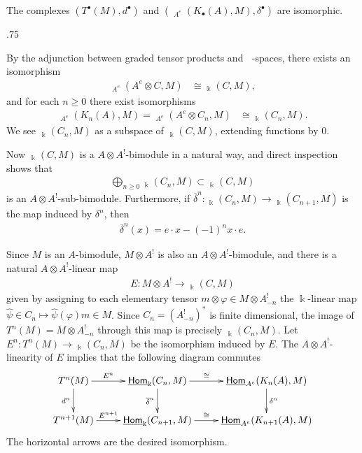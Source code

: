 \documentclass[11pt,fleqn]{article}
\makeatletter
\renewenvironment{proof}[1][\proofname]{\par
  \pushQED{\qed}%
  \normalfont \topsep.75\paraskip\relax
  \trivlist
  \item[\hskip\labelsep
        \itshape
    #1\@addpunct{.}]\ignorespaces
}{%
  \popQED\endtrivlist\@endpefalse
}
\newcommand\ot{\otimes}
\renewcommand\to{\longrightarrow}
\renewcommand\phi{\varphi}
\renewcommand\k{\Bbbk}
\DeclareMathOperator\HOM{\underline{\mathsf{Hom}}}
\makeatother
\begin{document}
\begin{Lemma*}
The complexes $(T^\bullet(M), d^\bullet)$ and $(\HOM_{A^e}(K_\bullet(A), M), 
\delta^\bullet)$ are isomorphic.
\end{Lemma*}
\begin{proof}
By the adjunction between graded tensor products and $\HOM$-spaces, there exists
an isomorphism
\begin{align*}
\HOM_{A^e}(A^e \ot C, M) &\cong \HOM_\k(C,M),
\end{align*}
and for each $n \geq 0$ there exist isomorphisms
\begin{align*}
\HOM_{A^e}(K_n(A), M) = \HOM_{A^e}(A^e \ot C_n, M) & \cong \HOM_\k(C_n, M).
\end{align*}
We see $\HOM_\k(C_n, M)$ as a subspace of $\HOM_\k(C, M)$, extending functions by $0$.

Now $\HOM_\k(C,M)$ is a $A \ot A^!$-bimodule in a natural way, and direct inspection 
shows that 
\begin{align*}
\bigoplus_{n \geq 0} \HOM_\k(C_n,M) \subset \HOM_\k(C,M)
\end{align*}
is an $A \ot A^!$-sub-bimodule. Furthermore, if $\overline \delta^n: \HOM_\k(C_n, M) \to 
\HOM_\k(C_{n+1}, M)$ is the map induced by $\delta^n$, then
\begin{align*}
	\overline\delta^n(x) = e \cdot x - (-1)^n x \cdot e.
\end{align*}

Since $M$ is an $A$-bimodule, $M \ot A^!$ is also an $A \ot A^!$-bimodule, and there is 
a natural $A \ot A^!$-linear map
\begin{align*}
	E: M \ot A^! \to \HOM_\k(C,M)
\end{align*}
given by assigning to each elementary tensor $m \ot \phi \in M \ot A^!_{-n}$ the 
$\k$-linear map $\hat \psi \in C_n \mapsto \hat\psi(\phi)m \in M$. Since $C_n = 
(A_{-n}^!)^*$ is finite dimensional, the image of $T^n(M) = M \ot A^!_{-n}$ through this 
map is precisely $\HOM_\k(C_n, M)$. Let $E^n: T^n(M) \to \HOM_\k(C_n, M)$ be the 
isomorphism induced by $E$. The $A \ot A^!$-linearity of $E$ implies that the following 
diagram commutes
\begin{align*}
\xymatrix{
	T^n(M) 
		\ar[d]_-{d^n} \ar[r]^-{E^n} 
	& \HOM_\k(C_n, M) 
		\ar[d]_-{\overline \delta^n} \ar[r]^-{\cong}
	& \HOM_{A^e}(K_n(A), M) 
		\ar[d]^-{\delta^n} \\
	T^{n+1}(M) 
		\ar[r]^-{E^{n+1}} 
	& \HOM_\k(C_{n+1}, M) 
		\ar[r]^-{\cong}
	& \HOM_{A^e}(K_{n+1}(A), M) 
}
\end{align*}
The horizontal arrows are the desired isomorphism.
\end{proof}
\end{document}
